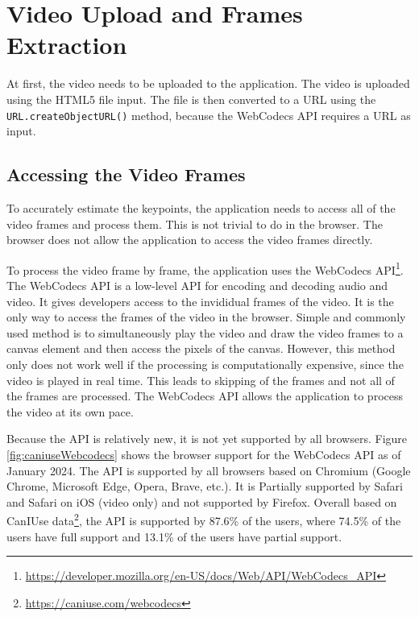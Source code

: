 \section{Video Upload and Frames Extraction}
\label{video_upload_and_processing}
At first, the video needs to be uploaded to the application. The video is uploaded using the HTML5 file input. The file is then converted to a URL using the \texttt{URL.createObjectURL()} method, because the WebCodecs API requires a URL as input.

\subsection{Accessing the Video Frames}

To accurately estimate the keypoints, the application needs to access all of the video frames and process them. This is not trivial to do in the browser. The browser does not allow the application to access the video frames directly.

To process the video frame by frame, the application uses the WebCodecs API\footnote{\url{https://developer.mozilla.org/en-US/docs/Web/API/WebCodecs_API}}. The WebCodecs API is a low-level API for encoding and decoding audio and video. It gives developers access to the invididual frames of the video. It is the only way to access the frames of the video in the browser. Simple and commonly used method is to simultaneously play the video and draw the video  frames to a canvas element and then access the pixels of the canvas. However, this method only does not work well if the processing is computationally expensive, since the video is played in real time. This leads to skipping of the frames and not all of the frames are processed. The WebCodecs API allows the application to process the video at its own pace.

Because the API is relatively new, it is not yet supported by all browsers. Figure \ref{fig:caniuseWebcodecs} shows the browser support for the WebCodecs API as of January 2024. The API is supported by all browsers based on Chromium (Google Chrome, Microsoft Edge, Opera, Brave, etc.). It is Partially supported by Safari and Safari on iOS (video only) and not supported by Firefox. Overall based on CanIUse data\footnote{\url{https://caniuse.com/webcodecs}}, the API is supported by 87.6\% of the users, where 74.5\% of the users have full support and 13.1\% of the users have partial support.


